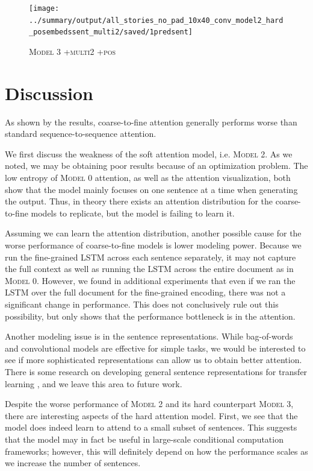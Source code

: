 \documentclass[12pt]{report}
\begin{document}
\begin{figure}[p]
\centering
\texttt{[image: ../summary/output/all\_stories\_no\_pad\_10x40\_conv\_model2\_hard\_posembedssent\_multi2/saved/1predsent]}
\caption[\textsc{Model 3 +multi2 +pos} Attention]{\textsc{Model 3 +multi2 +pos}}
\label{fig:last_attn}
\end{figure}



\chapter{Discussion}
\label{chap:discussion}

As shown by the results, coarse-to-fine attention generally performs worse than standard sequence-to-sequence attention.

We first discuss the weakness of the soft attention model, i.e. \textsc{Model 2}. As we noted, we may be obtaining poor results because of an optimization problem. The low entropy of \textsc{Model 0} attention, as well as the attention visualization, both show that the model mainly focuses on one sentence at a time when generating the output. Thus, in theory there exists an attention distribution for the coarse-to-fine models to replicate, but the model is failing to learn it.

Assuming we can learn the attention distribution, another possible cause for the worse performance of coarse-to-fine models is lower modeling power. Because we run the fine-grained LSTM across each sentence separately, it may not capture the full context as well as running the LSTM across the entire document as in \textsc{Model 0}.
However, we found in additional experiments that even if we ran the LSTM over the full document for the fine-grained encoding, there was not a significant change in performance. This does not conclusively rule out this possibility, but only shows that the performance bottleneck is in the attention.

Another modeling issue is in the sentence representations. While bag-of-words and convolutional models are effective for simple tasks, we would be interested to see if more sophisticated representations can allow us to obtain better attention. There is some research on developing general sentence representations for transfer learning \citep{Bowman2016}, and we leave this area to future work.


Despite the worse performance of \textsc{Model 2} and its hard counterpart \textsc{Model 3}, there are interesting aspects of the hard attention model. First, we see that the model does indeed learn to attend to a small subset of sentences. This suggests that the model may in fact be useful in large-scale conditional computation frameworks; however, this will definitely depend on how the performance scales as we increase the number of sentences.
\end{document}
